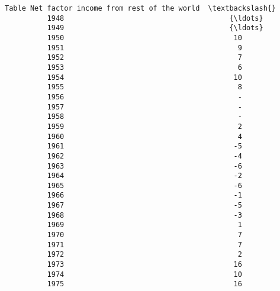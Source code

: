 \documentclass[11pt]{article}
\begin{document}
\begin{Verbatim}[commandchars=\\\{\}]
          Table Net factor income from rest of the world  \textbackslash{}
          1948                                       {\ldots}   
          1949                                       {\ldots}   
          1950                                        10   
          1951                                         9   
          1952                                         7   
          1953                                         6   
          1954                                        10   
          1955                                         8   
          1956                                         -   
          1957                                         -   
          1958                                         -   
          1959                                         2   
          1960                                         4   
          1961                                        -5   
          1962                                        -4   
          1963                                        -6   
          1964                                        -2   
          1965                                        -6   
          1966                                        -1   
          1967                                        -5   
          1968                                        -3   
          1969                                         1   
          1970                                         7   
          1971                                         7   
          1972                                         2   
          1973                                        16   
          1974                                        10   
          1975                                        16   
          

\end{Verbatim}
\end{document}
